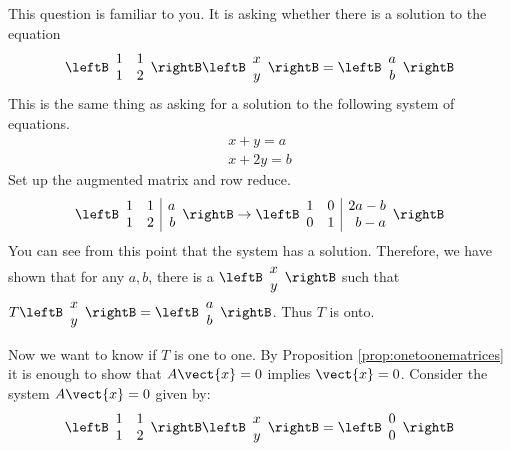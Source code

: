 \begin{solution}
This question is familiar to you. It is asking whether
there is a solution to the equation
\begin{equation*}
\leftB
\begin{array}{cc}
1 & 1 \\
1 & 2
\end{array}
\rightB \leftB
\begin{array}{c}
x \\
y
\end{array}
\rightB =\leftB
\begin{array}{c}
a \\
b
\end{array}
\rightB
\end{equation*}
This is the same thing as asking for a solution to the following system of
equations.
\begin{equation*}
\begin{array}{c}
x+y=a \\
x+2y=b
\end{array}
\end{equation*}
Set up the augmented matrix and row reduce.
\begin{equation}
\leftB
\begin{array}{rr|r}
1 & 1 & a \\
1 & 2 & b
\end{array}
\rightB \rightarrow \leftB
\begin{array}{rr|r}
1 & 0 & 2a-b \\
0 & 1 & b-a
\end{array}
\rightB
\label{ontomatrix}
\end{equation}
You can see from this point that the system has a solution. Therefore,
we have shown that for any $a, b$, there is a $
\leftB
\begin{array}{c}
x \\
y
\end{array}
\rightB$ such that $T\leftB
\begin{array}{c}
x \\
y
\end{array}
\rightB =\leftB
\begin{array}{c}
a \\
b
\end{array}
\rightB$.
Thus $T$ is onto.

Now we want to know if $T$ is one to one. 
By Proposition \ref{prop:onetoonematrices} it is enough to show that $A\vect{x}=0$ implies $\vect{x}=0$. 
Consider the system $A\vect{x}=0$ given by:
\begin{equation*}
\leftB
\begin{array}{cc}
1 & 1 \\
1 & 2\\
\end{array}
\rightB
\leftB
\begin{array}{c}
x\\
y
\end{array}
\rightB
=
\leftB
\begin{array}{c}
0 \\
0
\end{array}
\rightB
\end{equation*}


\end{solution}
